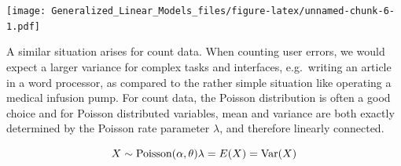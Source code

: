 \documentclass[]{svmono}
\newenvironment{Shaded}{\begin{snugshade}}{\end{snugshade}}
\newcommand{\KeywordTok}[1]{\textcolor[rgb]{0.13,0.29,0.53}{\textbf{#1}}}
\newcommand{\DataTypeTok}[1]{\textcolor[rgb]{0.13,0.29,0.53}{#1}}
\newcommand{\DecValTok}[1]{\textcolor[rgb]{0.00,0.00,0.81}{#1}}
\newcommand{\StringTok}[1]{\textcolor[rgb]{0.31,0.60,0.02}{#1}}
\newcommand{\OperatorTok}[1]{\textcolor[rgb]{0.81,0.36,0.00}{\textbf{#1}}}
\newcommand{\NormalTok}[1]{#1}
\theoremstyle{definition}
\theoremstyle{definition}
\theoremstyle{definition}
\theoremstyle{remark}
\begin{document}
\begin{Shaded}
\end{Shaded}

\texttt{[image: Generalized\_Linear\_Models\_files/figure-latex/unnamed-chunk-6-1.pdf]}

A similar situation arises for count data. When counting user errors, we
would expect a larger variance for complex tasks and interfaces,
e.g.~writing an article in a word processor, as compared to the rather
simple situation like operating a medical infusion pump. For count data,
the Poisson distribution is often a good choice and for Poisson
distributed variables, mean and variance are both exactly determined by
the Poisson rate parameter \(\lambda\), and therefore linearly
connected.

\[
X \sim \textrm{Poisson}(\alpha, \theta)\\
\lambda = E(X) = \textrm{Var}(X)
\]

\begin{Shaded}
\end{Shaded}
\end{document}
